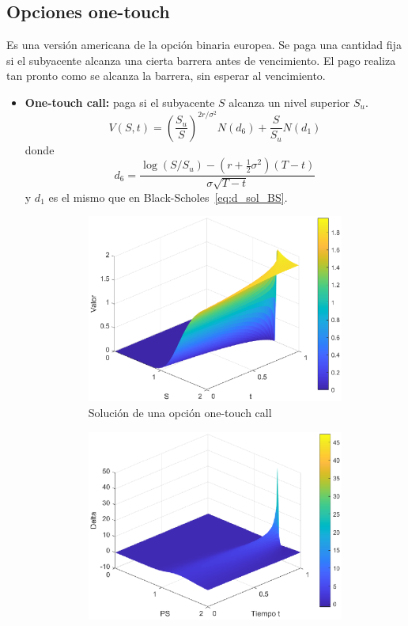 \subsection{Opciones one-touch}
Es una versión americana de la opción binaria  europea. Se paga una cantidad fija si el subyacente alcanza una cierta barrera antes de vencimiento. El pago realiza tan pronto como se alcanza la barrera, sin esperar al vencimiento.
\begin{itemize}
    \item \textbf{One-touch call:} paga si el subyacente $S$ alcanza un nivel superior $S_u$.
    \[
        \boxed{V(S, t) = \left( \frac{S_u}{S} \right)^{2r/\sigma^2} N(d_6) + \frac{S}{S_u} N(d_1)}
    \]
    donde
    \[
        \boxed{d_6 = \frac{\log(S/S_u) - (r + \frac{1}{2}\sigma^2)(T-t)}{\sigma\sqrt{T-t}}}
    \]
    y $d_1$ es el mismo que en Black-Scholes~\eqref{eq:d_sol_BS}.
    \begin{figure}[H]
        \centering
        \begin{subfigure}[b]{0.35\linewidth}
            \includegraphics[width=\linewidth]{Imagenes/Parte1/9_Americanas/One_Touch_Call.eps}
            \caption{Solución de una opción one-touch call}
        \end{subfigure}
        \begin{subfigure}[b]{0.35\linewidth}
            \includegraphics[width=\linewidth]{Imagenes/Parte1/9_Americanas/Delta_One_Touch_Call.eps}

\end{subfigure}
\end{figure}
\end{itemize}
